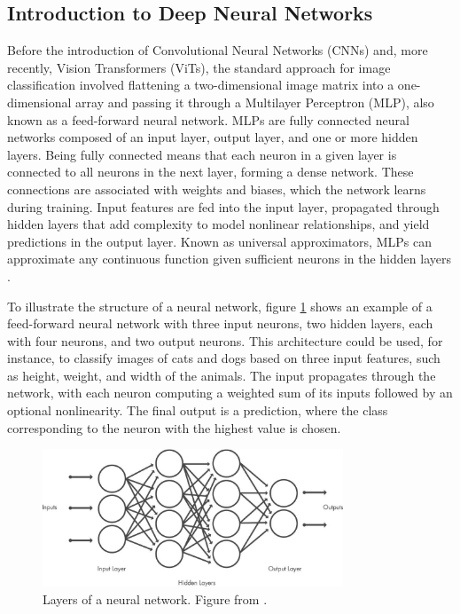 \subsection{Introduction to Deep Neural Networks}
\label{sec:intro_DNN}
Before the introduction of Convolutional Neural Networks (CNNs) and, more recently, Vision Transformers (ViTs), the standard approach for image classification involved flattening a two-dimensional image matrix into a one-dimensional array and passing it through a Multilayer Perceptron (MLP), also known as a feed-forward neural network. MLPs are fully connected neural networks composed of an input layer, output layer, and one or more hidden layers. Being fully connected means that each neuron in a given layer is connected to all neurons in the next layer, forming a dense network. These connections are associated with weights and biases, which the network learns during training. Input features are fed into the input layer, propagated through hidden layers that add complexity to model nonlinear relationships, and yield predictions in the output layer. Known as universal approximators, MLPs can approximate any continuous function given sufficient neurons in the hidden layers \cite{zhang2023dive,HORNIK1989359}.

To illustrate the structure of a neural network, figure \ref{fig:dnn_layers} shows an example of a feed-forward neural network with three input neurons, two hidden layers, each with four neurons, and two output neurons. This architecture could be used, for instance, to classify images of cats and dogs based on three input features, such as height, weight, and width of the animals. The input propagates through the network, with each neuron computing a weighted sum of its inputs followed by an optional nonlinearity. The final output is a prediction, where the class corresponding to the neuron with the highest value is chosen.

\begin{figure}[ht]
    \centering
    \includegraphics[width=0.8\textwidth]{Images/cnn_layers.jpg} 
    \caption{Layers of a neural network. Figure from \cite{mathworks_cnn}. }
    \label{fig:dnn_layers}
\end{figure}

